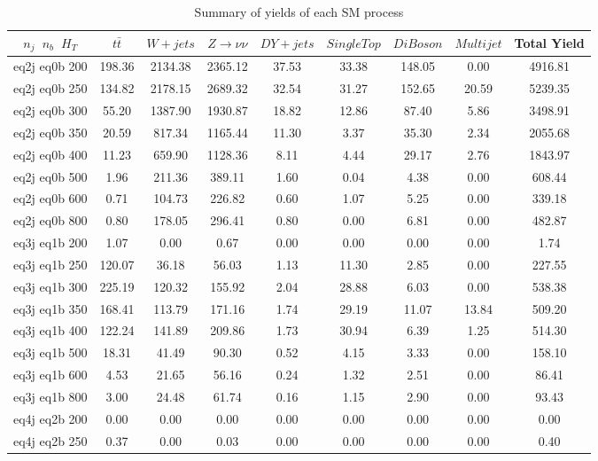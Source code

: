 \begin{longtable}{| c | c | c | c | c | c | c | c | c  | }
\caption{Summary of yields of each SM process} \label{tab:table} \\    \hline 
$n_{j}$~$n_{b}$~$H_{T}$ & $t\bar{t}$ & $W+jets$ & $Z \rightarrow \nu\nu$ & $DY+jets$ & $Single Top$ & $DiBoson$ & $Multijet$ & Total Yield\\ \hline 
eq2j eq0b 200 & 198.36 & 2134.38 & 2365.12 & 37.53 & 33.38 & 148.05 & 0.00 & 4916.81\\ \hline 
eq2j eq0b 250 & 134.82 & 2178.15 & 2689.32 & 32.54 & 31.27 & 152.65 & 20.59 & 5239.35\\ \hline 
eq2j eq0b 300 & 55.20 & 1387.90 & 1930.87 & 18.82 & 12.86 & 87.40 & 5.86 & 3498.91\\ \hline 
eq2j eq0b 350 & 20.59 & 817.34 & 1165.44 & 11.30 & 3.37 & 35.30 & 2.34 & 2055.68\\ \hline 
eq2j eq0b 400 & 11.23 & 659.90 & 1128.36 & 8.11 & 4.44 & 29.17 & 2.76 & 1843.97\\ \hline 
eq2j eq0b 500 & 1.96 & 211.36 & 389.11 & 1.60 & 0.04 & 4.38 & 0.00 & 608.44\\ \hline 
eq2j eq0b 600 & 0.71 & 104.73 & 226.82 & 0.60 & 1.07 & 5.25 & 0.00 & 339.18\\ \hline 
eq2j eq0b 800 & 0.80 & 178.05 & 296.41 & 0.80 & 0.00 & 6.81 & 0.00 & 482.87\\ \hline 
eq3j eq1b 200 & 1.07 & 0.00 & 0.67 & 0.00 & 0.00 & 0.00 & 0.00 & 1.74\\ \hline 
eq3j eq1b 250 & 120.07 & 36.18 & 56.03 & 1.13 & 11.30 & 2.85 & 0.00 & 227.55\\ \hline 
eq3j eq1b 300 & 225.19 & 120.32 & 155.92 & 2.04 & 28.88 & 6.03 & 0.00 & 538.38\\ \hline 
eq3j eq1b 350 & 168.41 & 113.79 & 171.16 & 1.74 & 29.19 & 11.07 & 13.84 & 509.20\\ \hline 
eq3j eq1b 400 & 122.24 & 141.89 & 209.86 & 1.73 & 30.94 & 6.39 & 1.25 & 514.30\\ \hline 
eq3j eq1b 500 & 18.31 & 41.49 & 90.30 & 0.52 & 4.15 & 3.33 & 0.00 & 158.10\\ \hline 
eq3j eq1b 600 & 4.53 & 21.65 & 56.16 & 0.24 & 1.32 & 2.51 & 0.00 & 86.41\\ \hline 
eq3j eq1b 800 & 3.00 & 24.48 & 61.74 & 0.16 & 1.15 & 2.90 & 0.00 & 93.43\\ \hline 
eq4j eq2b 200 & 0.00 & 0.00 & 0.00 & 0.00 & 0.00 & 0.00 & 0.00 & 0.00\\ \hline 
eq4j eq2b 250 & 0.37 & 0.00 & 0.03 & 0.00 & 0.00 & 0.00 & 0.00 & 0.40\\ \hline 

\end{longtable}
